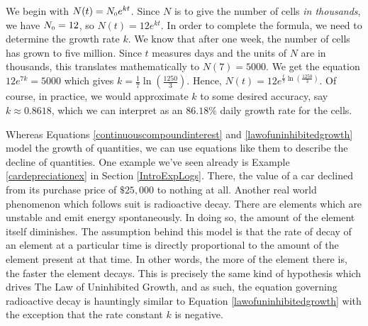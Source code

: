 \medskip

{ We begin with $N(t) = N_{\mbox{\tiny$0$}}e^{kt}$.  Since $N$ is to give the number of cells \textit{in thousands}, we have $N_{\mbox{\tiny$0$}} = 12$, so $N(t) = 12e^{kt}$.  In order to complete the formula, we need to determine the growth rate $k$.  We know that after one week, the number of cells has grown to five million.  Since $t$ measures days and the units of $N$ are in thousands, this translates mathematically to $N(7) = 5000$.  We get the equation $12e^{7k} = 5000$ which gives $k = \frac{1}{7} \ln\left(\frac{1250}{3}\right)$.  Hence,  $N(t) = 12e^{ \frac{t}{7} \ln\left(\frac{1250}{3}\right)}$.  Of course, in practice, we would approximate $k$ to some desired accuracy, say $k \approx 0.8618$, which we can interpret as an $86.18 \%$ daily growth rate for the cells.}

\medskip

Whereas Equations \ref{continuouscompoundinterest} and \ref{lawofuninhibitedgrowth} model the growth of quantities, we can use equations like them to describe the decline of quantities.  One example we've seen already is Example \ref{cardepreciationex} in Section \ref{IntroExpLogs}.  There, the value of a car declined from its purchase price of $\$25,\!000$ to nothing at all.  Another real world phenomenon which follows suit is radioactive decay.  There are elements which are unstable and emit energy spontaneously.  In doing so, the amount of the element itself diminishes.  The assumption behind this model is that the rate of decay of an element at a particular time is directly proportional to the amount of the element present at that time.  In other words, the more of the element there is, the faster the element decays.  This is precisely the same kind of hypothesis which drives The Law of Uninhibited Growth, and as such, the equation governing radioactive decay is hauntingly similar to Equation \ref{lawofuninhibitedgrowth} with the exception that the rate constant $k$ is negative.

\smallskip


